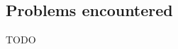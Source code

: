 \documentclass{article}
\begin{document}
\subsection{Problems encountered}

TODO

















\end{document}
